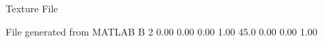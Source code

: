 Texture File

File generated from MATLAB
B 2
   0.00   0.00   0.00  1.00
   45.0   0.00   0.00  1.00
